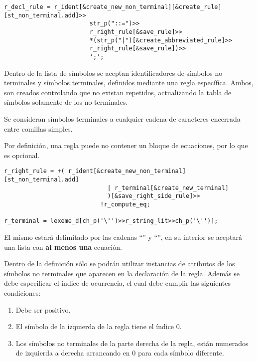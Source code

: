 \begin{lstlisting}[columns=fullflexible]
r_decl_rule = r_ident[&create_new_non_terminal][&create_rule][st_non_terminal.add]>>
                        str_p("::=")>>
                        r_right_rule[&save_rule]>>
                        *(str_p("|")[&create_abbreviated_rule]>>
                        r_right_rule[&save_rule])>>
                        ';';
\end{lstlisting}

Dentro de la lista de símbolos se aceptan identificadores de símbolos no terminales y símbolos terminales, definidos mediante una regla específica. Ambos, son creados controlando que no existan repetidos, actualizando la tabla de símbolos solamente de los no terminales.

Se consideran símbolos terminales a cualquier cadena de caracteres encerrada entre comillas simples.

Por definición, una regla puede no contener un bloque de ecuaciones, por lo que es opcional.

\begin{lstlisting}[columns=fullflexible, linewidth=13.5cm]
r_right_rule = +( r_ident[&create_new_non_terminal][st_non_terminal.add]
                             | r_terminal[&create_new_terminal]
                             )[&save_right_side_rule]>>
                           !r_compute_eq;

r_terminal = lexeme_d[ch_p('\'')>>r_string_lit>>ch_p('\'')];
\end{lstlisting}

El mismo estará delimitado por las cadenas ``'' y ``'', en su interior se aceptará una lista con \textbf{al menos una} ecuación.

Dentro de la definición sólo se podrán utilizar instancias de atributos de los símbolos no terminales que aparecen en la declaración de la regla. Además se debe especificar el índice de ocurrencia, el cual debe cumplir las siguientes condiciones:

\begin{enumerate}
\item Debe ser positivo.
\item El símbolo de la izquierda de la regla tiene el índice 0.
\item Los símbolos no terminales de la parte derecha de la regla, están numerados de izquierda a derecha arrancando en 0 para cada símbolo diferente.
\end{enumerate}

